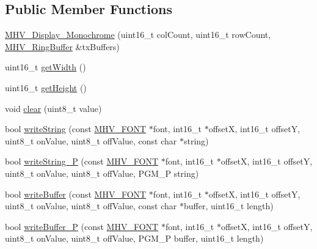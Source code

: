 \subsection*{\-Public \-Member \-Functions}
\begin{DoxyCompactItemize}
\item 
\hyperlink{class_m_h_v___display___monochrome_ae9bac3772b5baa006b04121c0caf0d8b}{\-M\-H\-V\-\_\-\-Display\-\_\-\-Monochrome} (uint16\-\_\-t col\-Count, uint16\-\_\-t row\-Count, \hyperlink{class_m_h_v___ring_buffer}{\-M\-H\-V\-\_\-\-Ring\-Buffer} \&tx\-Buffers)
\item 
uint16\-\_\-t \hyperlink{class_m_h_v___display___monochrome_a1ef9b1ddbc9e57007903076005335211}{get\-Width} ()
\item 
uint16\-\_\-t \hyperlink{class_m_h_v___display___monochrome_a988a98e01d54b12d3dcecc2d7878a985}{get\-Height} ()
\item 
void \hyperlink{class_m_h_v___display___monochrome_a25b062aefde440ad5c47dbca98b5b478}{clear} (uint8\-\_\-t value)
\item 
bool \hyperlink{class_m_h_v___display___monochrome_aaf243ab4abd9bc1c3a298a10dc178d99}{write\-String} (const \hyperlink{_m_h_v___font_8h_ab7088ba808ac223275dfd526d198356f}{\-M\-H\-V\-\_\-\-F\-O\-N\-T} $\ast$font, int16\-\_\-t $\ast$offset\-X, int16\-\_\-t offset\-Y, uint8\-\_\-t on\-Value, uint8\-\_\-t off\-Value, const char $\ast$string)
\item 
bool \hyperlink{class_m_h_v___display___monochrome_a3942e2c4facd80affaeef8c7b8e6dcfb}{write\-String\-\_\-\-P} (const \hyperlink{_m_h_v___font_8h_ab7088ba808ac223275dfd526d198356f}{\-M\-H\-V\-\_\-\-F\-O\-N\-T} $\ast$font, int16\-\_\-t $\ast$offset\-X, int16\-\_\-t offset\-Y, uint8\-\_\-t on\-Value, uint8\-\_\-t off\-Value, \-P\-G\-M\-\_\-\-P string)
\item 
bool \hyperlink{class_m_h_v___display___monochrome_abe4588ca31be3759738e38922fe8d3ad}{write\-Buffer} (const \hyperlink{_m_h_v___font_8h_ab7088ba808ac223275dfd526d198356f}{\-M\-H\-V\-\_\-\-F\-O\-N\-T} $\ast$font, int16\-\_\-t $\ast$offset\-X, int16\-\_\-t offset\-Y, uint8\-\_\-t on\-Value, uint8\-\_\-t off\-Value, const char $\ast$buffer, uint16\-\_\-t length)
\item 
bool \hyperlink{class_m_h_v___display___monochrome_a8e71ea1bf003d91679892f20389e851b}{write\-Buffer\-\_\-\-P} (const \hyperlink{_m_h_v___font_8h_ab7088ba808ac223275dfd526d198356f}{\-M\-H\-V\-\_\-\-F\-O\-N\-T} $\ast$font, int16\-\_\-t $\ast$offset\-X, int16\-\_\-t offset\-Y, uint8\-\_\-t on\-Value, uint8\-\_\-t off\-Value, \-P\-G\-M\-\_\-\-P buffer, uint16\-\_\-t length)

\end{DoxyCompactItemize}
